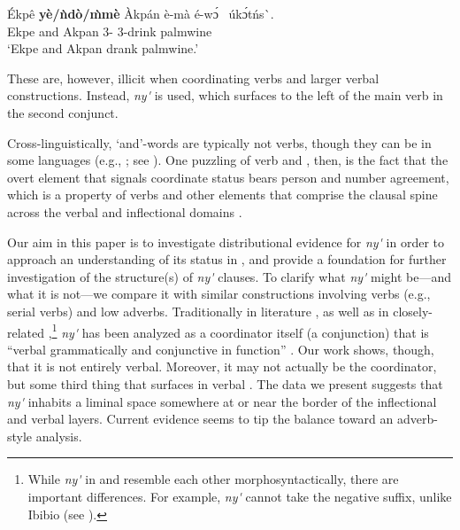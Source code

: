 \documentclass[output=paper,modfonts,nonflat,
colorlinks, citecolor=brown,
]{langsci/langscibook}
\begin{document}
\ea\label{ex:duncan-et-al:2}
\gll \'{E}kpê \textbf{y\`{e}/ǹd\`{o}/\`{m}m\`{e}} \`{A}kpán \`{e}-mà é-\ng w\'ɔ\ng~ úk\'ɔtńs\`{\textturnv}\ng. \\
Ekpe and Akpan 3{\PL}-{\PST} 3{\PL}-drink palmwine \\
\glt ‘Ekpe and Akpan drank palmwine.’
\z

\noindent These are, however, illicit when coordinating verbs and larger verbal constructions. Instead, \textit{ny\'{\textturnv}\ng} is used, which surfaces to the left of the main verb in the second conjunct.

\ea\label{ex:duncan-et-al:3}
\z
\z

\noindent Cross-linguistically, `and'-words are typically not verbs, though they can be in some languages (e.g., ; see \citealt{brown2008verbs}). One puzzling  of  verb and , then, is the fact that the overt element that signals coordinate status bears person and number agreement, which is a property of verbs and other elements that comprise the clausal spine across the verbal and inflectional domains \citep{baker2010agreement}.

Our aim in this paper is to investigate distributional evidence for \textit{ny\'{\textturnv}\ng} in order to approach an understanding of its status in , and provide a foundation for further investigation of the structure(s) of \textit{ny\'{\textturnv}\ng} clauses. To clarify what \textit{ny\'{\textturnv}\ng} might be---and what it is not---we compare it with similar constructions involving verbs (e.g., serial verbs) and low adverbs. Traditionally in  literature \citep{essien1985negation,essien1990grammar}, as well as in closely-related  \citep{goldie1857principles,welmers1968efik,welmers1973african},\footnote{While \textit{ny\'{\textturnv}\ng} in  and  resemble each other morphosyntactically, there are important differences. For example,  \textit{ny\'{\textturnv}\ng} cannot take the negative suffix, unlike Ibibio (see ).} \textit{ny\'{\textturnv}\ng} has been analyzed as a coordinator itself (a conjunction) that is ``verbal grammatically and conjunctive in function'' \citep[148]{essien1990grammar}. Our work shows, though, that it is not entirely verbal. Moreover, it may not actually be the coordinator, but some third thing that surfaces in verbal . The data we present suggests that \textit{ny\'{\textturnv}\ng} inhabits a liminal space somewhere at or near the border of the inflectional and verbal layers. Current evidence seems to tip the balance toward an adverb-style analysis.
\end{document}

